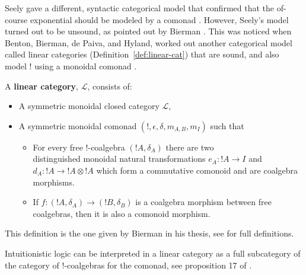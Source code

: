 \documentclass[preprint,12pt]{elsarticle}
\begin{document}
Seely gave a different, syntactic categorical model that confirmed
that the of-course exponential should be modeled by a comonad
\cite{Seely:1989}.  However, Seely's model turned out to be unsound,
as pointed out by Bierman \cite{Bierman:1994}.  This 
was noticed when
Benton, Bierman,  de Paiva, and Hyland,  
worked out another categorical
model called linear categories (Definition~\ref{def:linear-cat}) that
are sound, and also model $!$ using a monoidal comonad
\cite{Bierman:1994}.  
\begin{definition}
  \label{def:linear-cat}
  A \textbf{linear category}, $\mathcal{L}$, consists of:
  \begin{center}
    \begin{itemize}
    \item A symmetric monoidal closed category $\mathcal{L}$,
    \item A symmetric monoidal comonad $(!, \epsilon, \delta, m_{A,B},
      m_I)$ such that 
      \begin{itemize}
      \item For every free $!$-coalgebra $(!A,\delta_A)$ there are two\\
        distinguished monoidal natural transformations $e_A : !A \to
        I$ and $d_A : !A \to !A \otimes !A$ which form a commutative
        comonoid and are coalgebra morphisms.
      \item If $f : (!A,\delta_A) \to (!B,\delta_B)$ is a coalgebra
        morphism between free coalgebras, then it is also a comonoid
        morphism.
      \end{itemize}
    \end{itemize}
  \end{center}
  This definition is the one given by Bierman in his thesis, see
  \cite{Bierman:1994} for full definitions.
\end{definition}
\noindent
Intuitionistic logic can be interpreted in a linear category as a
full subcategory of the category of $!$-coalgebras for the comonad,
see proposition 17 of \cite{Bierman:1994}.
\end{document}
